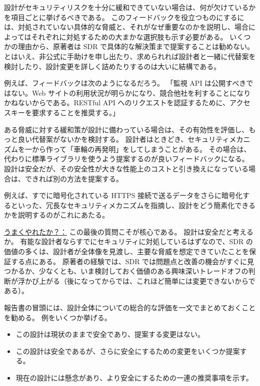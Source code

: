 \documentclass[uplatex]{jsarticle}
\def\label#1{}%
\begin{document}
設計がセキュリティリスクを十分に緩和できていない場合は、何が欠けているかを項目ごとに挙げるべきである。
このフィードバックを役立つものにするには、対処されていない具体的な脅威と、それがなぜ重要なのかを説明し、場合によってはそれぞれに対処するための大まかな選択肢も示す必要がある。
いくつかの理由から、原著者は SDR で具体的な解決策まで提案することは勧めない。
とはいえ、非公式に手助けを申し出たり、求められれば設計者と一緒に代替案を検討したり、設計変更を詳しく詰めたりするのは大いに結構である。

\begin{exa}[監視APIについてのフィードバック]\label{exa:ch7-monitoring-api}
例えば、フィードバックは次のようになるだろう。
「監視 API は公開すべきではない。Web サイトの利用状況が明らかになり、競合他社を利することになりかねないからである。RESTful API へのリクエストを認証するために、アクセスキーを要求することを推奨する。」
\end{exa}

ある脅威に対する緩和策が設計に備わっている場合は、その有効性を評価し、もっと良い代替案がないかを検討する。
設計者はときどき、セキュリティメカニズムを一から作って「車輪の再発明」をしてしまうことがある。
その場合は、代わりに標準ライブラリを使うよう提案するのが良いフィードバックになる。
設計は安全だが、その安全性が大きな性能上のコストと引き換えになっている場合は、できれば別の方法を提案する。

\begin{exa}[冗長なセキュリティメカニズム]\label{exa:ch7-redundant-encryption}
例えば、すでに暗号化されている HTTPS 接続で送るデータをさらに暗号化するといった、冗長なセキュリティメカニズムを指摘し、設計をどう簡素化できるかを説明するのがこれにあたる。
\end{exa}

\underline{うまくやれたか？：}
この最後の質問こそが核心である。
設計は安全だと考えるか。
有能な設計者ならすでにセキュリティに対処しているはずなので、SDR の価値の多くは、設計者が全体像を見渡し、主要な脅威を想定できていたことを保証する点にある。
原著者の経験では、SDR では問題点と改善の機会がすぐに見つかるか、少なくとも、いま検討しておく価値のある興味深いトレードオフの判断が浮かび上がる（後になってからでは、これほど簡単には変更できないからである）。

報告書の冒頭には、設計全体についての総合的な評価を一文でまとめておくことを勧める。
例をいくつか挙げる。
\begin{itemize}
\item この設計は現状のままで安全であり、提案する変更はない。
\item この設計は安全であるが、さらに安全にするための変更をいくつか提案する。
\item 現在の設計には懸念があり、より安全にするための一連の推奨事項を示す。
\end{itemize}
\end{document}
